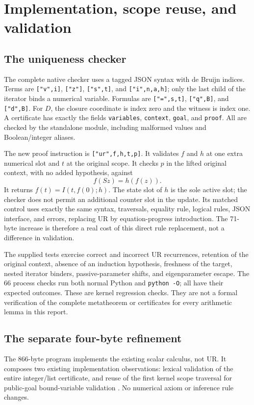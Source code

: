 \section{Implementation, scope reuse, and validation}

\subsection{The uniqueness checker}
The complete native checker uses a tagged JSON syntax with de Bruijn
indices.  Terms are \texttt{["v",i]}, \texttt{["z"]},
\texttt{["s",t]}, and \texttt{["i",n,a,h]}; only the last child of
the iterator binds a numerical variable.  Formulas are
\texttt{["=",s,t]}, \texttt{["q",B]}, and \texttt{["d",B]}.
For $D$, the closure coordinate is index zero and the witness is index one.
A certificate has exactly the fields \texttt{variables}, \texttt{context},
\texttt{goal}, and \texttt{proof}.  All are checked by the standalone
module, including malformed values and Boolean/integer aliases.

The new proof instruction is
\texttt{["ur",f,h,t,p]}.  It validates $f$ and $h$ at one extra numerical
slot and $t$ at the original scope.  It checks $p$ in the lifted original
context, with no added hypothesis, against
\[
 f(Sz)=h(f(z)).
\]
It returns $f(t)=I(t,f(0);h)$.  The state slot of $h$ is the sole active
slot; the checker does not permit an additional counter slot in the
update.  Its matched control uses exactly the same syntax, traversals,
equality rule, logical rules, JSON interface, and errors, replacing UR
by equation-progress introduction.  The 71-byte increase is therefore a
real cost of this direct rule replacement, not a difference in validation.

The supplied tests exercise correct and incorrect UR recurrences, retention
of the original context, absence of an induction hypothesis, freshness
of the target, nested iterator binders, passive-parameter shifts, and
eigenparameter escape.  The 66 process checks run both normal Python and
\texttt{python -O}; all have their expected outcomes.  These are kernel
regression checks.  They are not a formal verification of the complete
metatheorem or certificates for every arithmetic lemma in this report.

\subsection{The separate four-byte refinement}
The 866-byte program implements the existing scalar calculus, not UR.
It composes two existing implementation observations: lexical validation
of the entire integer/list certificate, and reuse of the first kernel
scope traversal for public-goal bound-variable validation
\cite{validated,scope}.  No numerical axiom or inference rule changes.

